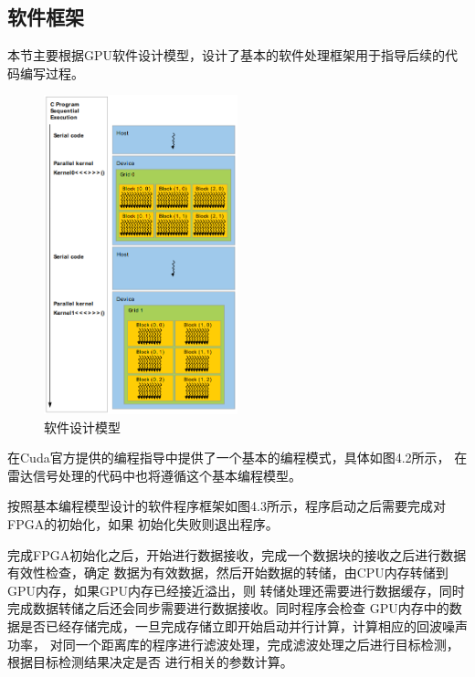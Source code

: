 \documentclass[a4paper,12pt]{report}
\begin{document}
\begin{spacing}{1.5}
\section{软件框架}
本节主要根据GPU软件设计模型，设计了基本的软件处理框架用于指导后续的代码编写过程。
\begin{figure}[htbp]
    \centering
    \includegraphics [width=0.5\textwidth]{figure//softflow.png}
    \caption{软件设计模型}\label{softflow}
\end{figure}

在Cuda官方提供的编程指导\cite{CudaGuide}中提供了一个基本的编程模式，具体如图4.2所示，
在雷达信号处理的代码中也将遵循这个基本编程模型。

按照基本编程模型设计的软件程序框架如图4.3所示，程序启动之后需要完成对FPGA的初始化，如果
初始化失败则退出程序。

完成FPGA初始化之后，开始进行数据接收，完成一个数据块的接收之后进行数据有效性检查，确定
数据为有效数据，然后开始数据的转储，由CPU内存转储到GPU内存，如果GPU内存已经接近溢出，则
转储处理还需要进行数据缓存，同时完成数据转储之后还会同步需要进行数据接收。同时程序会检查
GPU内存中的数据是否已经存储完成，一旦完成存储立即开始启动并行计算，计算相应的回波噪声功率，
对同一个距离库的程序进行滤波处理，完成滤波处理之后进行目标检测，根据目标检测结果决定是否
进行相关的参数计算。


\end{spacing}
\end{document}
